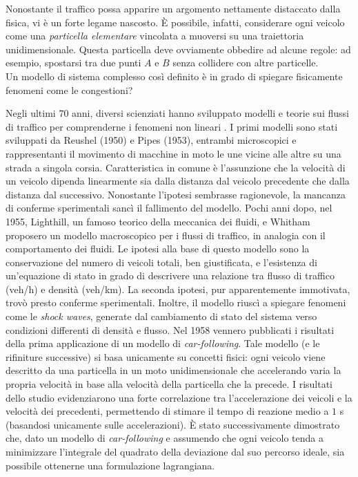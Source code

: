 \documentclass[../main.tex]{subfiles}
\begin{document}
Nonostante il traffico possa apparire un argomento nettamente distaccato dalla fisica, vi \`e un forte legame nascosto.
\`E possibile, infatti, considerare ogni veicolo come una \emph{particella elementare} vincolata a muoversi su una traiettoria unidimensionale.
Questa particella deve ovviamente obbedire ad alcune regole: ad esempio, spostarsi tra due punti $A$ e $B$ senza collidere con altre particelle.\\
Un modello di sistema complesso cos\`i definito \`e in grado di spiegare fisicamente fenomeni come le congestioni?

Negli ultimi 70 anni, diversi scienziati hanno sviluppato modelli e teorie sui flussi di traffico per comprenderne i fenomeni non lineari \cite{bs2004physics}.
I primi modelli sono stati sviluppati da Reushel (1950) e Pipes (1953), entrambi microscopici e rappresentanti il movimento di macchine in moto le une vicine alle altre su una strada a singola corsia.
Caratteristica in comune \`e l'assunzione che la velocit\`a di un veicolo dipenda linearmente sia dalla distanza dal veicolo precedente che dalla distanza dal successivo.
Nonostante l'ipotesi sembrasse ragionevole, la mancanza di conferme sperimentali sanc\`i il fallimento del modello.
Pochi anni dopo, nel 1955, Lighthill, un famoso teorico della meccanica dei fluidi, e Whitham proposero un modello macroscopico per i flussi di traffico, in analogia con il comportamento dei fluidi.
Le ipotesi alla base di questo modello sono la conservazione del numero di veicoli totali, ben giustificata, e l'esistenza di un'equazione di stato in grado di descrivere una relazione tra flusso di traffico (veh/h) e densit\`a (veh/km).
La seconda ipotesi, pur apparentemente immotivata, trov\`o presto conferme sperimentali.
Inoltre, il modello riusc\`i a spiegare fenomeni come le \emph{shock waves}, generate dal cambiamento di stato del sistema verso condizioni differenti di densit\`a e flusso.
Nel 1958 vennero pubblicati i risultati della prima applicazione di un modello di \emph{car-following}.
Tale modello (e le rifiniture successive) si basa unicamente su concetti fisici: ogni veicolo viene descritto da una particella in un moto unidimensionale che accelerando varia la propria velocit\`a in base alla velocit\`a della particella che la precede.
I risultati dello studio evidenziarono una forte correlazione tra l'accelerazione dei veicoli e la velocit\`a dei precedenti, permettendo di stimare il tempo di reazione medio a $1$ s (basandosi unicamente sulle accelerazioni).
\`E stato successivamente dimostrato che, dato un modello di \emph{car-following} e assumendo che ogni veicolo tenda a minimizzare l'integrale del quadrato della deviazione dal suo percorso ideale, sia possibile ottenerne una formulazione lagrangiana.
\end{document}
